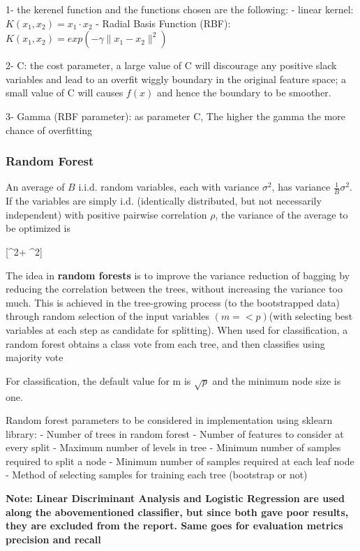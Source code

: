 \documentclass[11pt]{article}
\begin{document}
1- the kerenel function and the functions chosen are the following: -
linear kernel: \(K(x_1,x_2)= x_1⋅x_2\) - Radial Basis Function (RBF):
\(K(x_1,x_2)=exp (−\gamma∥x_1−x_2∥^2)\)

2- C: the cost parameter, a large value of C will discourage any
positive slack variables and lead to an overfit wiggly boundary in the
original feature space; a small value of C will causes \(f(x)\) and
hence the boundary to be smoother.

3- Gamma (RBF parameter): as parameter C, The higher the gamma the more
chance of overfitting

    \hypertarget{random-forest}{%
\subsubsection{Random Forest}\label{random-forest}}

An average of \(B\) i.i.d. random variables, each with variance
\(\sigma^2\), has variance \(\frac{1}{B} \sigma^2\). If the variables
are simply i.d. (identically distributed, but not necessarily
independent) with positive pairwise correlation \(\rho\), the variance
of the average to be optimized is

{[}\rho \sigma\^{}2+ \sigma\^{}2{]}

The idea in \textbf{random forests} is to improve the variance reduction
of bagging by reducing the correlation between the trees, without
increasing the variance too much. This is achieved in the tree-growing
process (to the bootstrapped data) through random selection of the input
variables \((m =<p)\)(with selecting best variables at each step as
candidate for splitting). When used for classification, a random forest
obtains a class vote from each tree, and then classifies using majority
vote

For classification, the default value for m is \(\sqrt{p}\) and the
minimum node size is one.

Random forest parameters to be considered in implementation using
sklearn library: - Number of trees in random forest - Number of features
to consider at every split - Maximum number of levels in tree - Minimum
number of samples required to split a node - Minimum number of samples
required at each leaf node - Method of selecting samples for training
each tree (bootstrap or not)

\textbf{Note: Linear Discriminant Analysis and Logistic Regression are
used along the abovementioned classifier, but since both gave poor
results, they are excluded from the report. Same goes for evaluation
metrics precision and recall}
\end{document}
